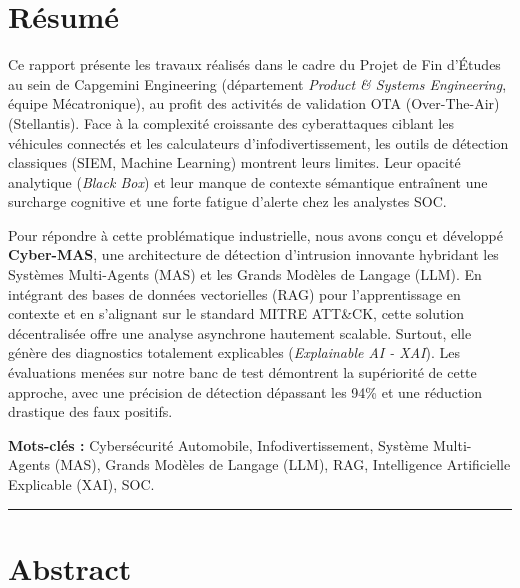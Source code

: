 \documentclass[a4paper, 12pt]{report}
\begin{document}
\chapter*{Résumé}

Ce rapport présente les travaux réalisés dans le cadre du Projet de Fin d'Études au sein de Capgemini Engineering (département \textit{Product \& Systems Engineering}, équipe Mécatronique), au profit des activités de validation OTA (Over-The-Air) (Stellantis). Face à la complexité croissante des cyberattaques ciblant les véhicules connectés et les calculateurs d'infodivertissement, les outils de détection classiques (SIEM, Machine Learning) montrent leurs limites. Leur opacité analytique (\textit{Black Box}) et leur manque de contexte sémantique entraînent une surcharge cognitive et une forte fatigue d'alerte chez les analystes SOC. 

Pour répondre à cette problématique industrielle, nous avons conçu et développé \textbf{Cyber-MAS}, une architecture de détection d'intrusion innovante hybridant les Systèmes Multi-Agents (MAS) et les Grands Modèles de Langage (LLM). En intégrant des bases de données vectorielles (RAG) pour l'apprentissage en contexte et en s'alignant sur le standard MITRE ATT\&CK, cette solution décentralisée offre une analyse asynchrone hautement scalable. Surtout, elle génère des diagnostics totalement explicables (\textit{Explainable AI - XAI}). Les évaluations menées sur notre banc de test démontrent la supériorité de cette approche, avec une précision de détection dépassant les 94\% et une réduction drastique des faux positifs.

\vspace{0.5cm}
\noindent \textbf{Mots-clés :} Cybersécurité Automobile, Infodivertissement, Système Multi-Agents (MAS), Grands Modèles de Langage (LLM), RAG, Intelligence Artificielle Explicable (XAI), SOC.

\vspace{2cm}

\begin{center}
    \rule{0.5\textwidth}{0.4pt}
\end{center}

\vspace{2cm}

\chapter*{Abstract}
\end{document}
